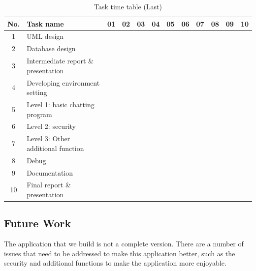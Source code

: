 \documentclass[a4paper,11pt]{article}
\begin{document}
\begin{table}[h]
\centering
\caption{Task time table (Last)}
\label{my-label}
\begin{tabular}{|c|l||c|c|c|c|c|c|c|c|c|c|}
\hline
\rowcolor{No}
No. & Task name & 01 & 02 & 03 & 04 & 05 & 06 & 07 & 08 & 09 & 10 \\ \hline \hline
1 & UML design & \cellcolor{UML} & \cellcolor{UML} &  &  &  &  &  &  &  &  \\ \hline
2 & Database design & \cellcolor{Data} & \cellcolor{Data} &  &  &  &  &  &  &  &  \\ \hline
3 & Intermediate report \& presentation &  & \cellcolor{intermediate} & \cellcolor{intermediate} &  &  &  &  &  &  &  \\ \hline
4 & Developing environment setting &  &  & \cellcolor{environ} &  &  &  &  &  &  &  \\ \hline
5 & Level 1: basic chatting program &  &  &  & \cellcolor{level1} & \cellcolor{level1} & \cellcolor{level1}  & \cellcolor{level1} & \cellcolor{level1}  &  &  \\ \hline
6 & Level 2: security &  &  &  &  & &  & \cellcolor{level2}  & \cellcolor{level2}  & \cellcolor{level2} &  \cellcolor{level2} \\ \hline
7 & Level 3: Other additional function &  &  &  &  &  &  &  &  &  &  \\ \hline
8 & Debug &  &  &  &  & \cellcolor{debug} & \cellcolor{debug} & \cellcolor{debug} & \cellcolor{debug} & \cellcolor{debug} & \cellcolor{debug} \\ \hline
9 & Documentation &  &  &  &  & \cellcolor{documentation} &  & \cellcolor{documentation} &  & \cellcolor{documentation} &  \\ \hline
10 & Final report \& presentation &  &  &  &  &  &  &  &  & \cellcolor{final} & \cellcolor{final} \\ \hline
\end{tabular}
\end{table}




\subsection{Future Work}
The application that we build is not a complete version. There are a number of issues that need to be addressed to make this application better, such as the security and additional functions to make the application more enjoyable.
\end{document}
